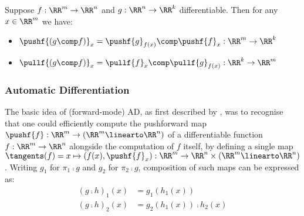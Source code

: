 %
%

\begin{proposition}
Suppose $f: \RR^m \to \RR^n$ and $g: \RR^n \to \RR^k$ differentiable. Then for any $x \in \RR^m$ we have:

\begin{itemize}
\item $\pushf{(g \comp f)}_x = \pushf{g}_{f(x)} \comp \pushf{f}_x: \RR^m \to \RR^k$
\item $\pullf{(g \comp f)}_x = \pullf{f}_{x} \comp \pullf{g}_{f(x)}: \RR^k \to \RR^m$
\end{itemize}
\end{proposition}

\subsubsection{Automatic Differentiation}

The basic idea of (forward-mode) AD, as first described by \citet{linnainmaa76}, was to recognise that one
could efficiently compute the pushforward map $\pushf{f}: \RR^m \to (\RR^m \linearto \RR^n)$ of a
differentiable function $f: \RR^m \to \RR^n$ alongside the computation of $f$ itself, by defining a single map
$\tangents(f) = x \mapsto (f(x), \pushf{f}_x): \RR^m \to \RR^n \times (\RR^m \linearto \RR^n)$. Writing $g_1$
for $\pi_1 \comp g$ and $g_2$ for $\pi_2 \comp g$, composition of such maps can be expressed as:
\begin{align*}
(g \comp h)_1(x) &= g_1(h_1(x)) \\
(g \comp h)_2(x) &= g_2(h_1(x)) \comp h_2(x)
\end{align*}

